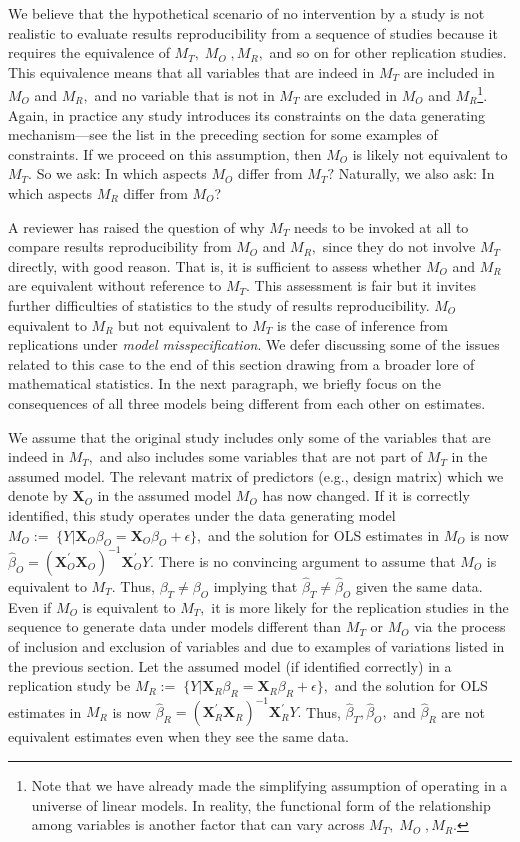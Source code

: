 \documentclass[meta,authordate]{jote-new-article}
\newcommand{\X}{\mathbf{X}}
\newcounter{result}
\begin{document}
We believe that the hypothetical scenario of no intervention by a study is not realistic to evaluate results reproducibility from a sequence of studies because it requires the equivalence of $M_T,\;M_O\;,M_R,$ and so on for other replication studies. This equivalence means that all variables that are indeed in $M_T$ are included in $M_O$ and $M_R,$ and no variable that is not in $M_T$ are excluded in $M_O$ and $M_R$\footnote{Note that we have already made the simplifying assumption of operating in a universe of linear models. In reality, the functional form of the relationship among variables is another factor that can vary across $M_T,\;M_O\;,M_R$.}. Again, in practice any study introduces its constraints on the data generating mechanism---see the list in the preceding section for some examples of constraints. If we proceed on this assumption, then $M_O$ is likely not equivalent to $M_T.$ So we ask: In which aspects $M_O$ differ from $M_T?$ Naturally, we also ask: In which aspects $M_R$ differ from $M_O$?

A reviewer has raised the question of why $M_T$ needs to be invoked at all to compare results reproducibility from $M_O$ and $M_R,$ since they do not involve $M_T$ directly, with good reason. That is, it is sufficient to assess whether $M_O$ and $M_R$ are equivalent without reference to $M_T$. This assessment is fair but it invites further difficulties of statistics to the study of results reproducibility. $M_O$ equivalent to $M_R$ but not equivalent to $M_T$ is the case of inference from replications under {\em model misspecification}. We defer discussing some of the issues related to this case to the end of this section drawing from a broader lore of mathematical statistics. In the next paragraph, we briefly focus on the consequences of all three models being different from each other on estimates.

We assume that the original study includes only some of the variables that are indeed in $M_T,$ and also includes some variables that are not part of $M_T$ in the assumed model. The relevant matrix of predictors (e.g., design matrix) which we denote by $\X_{O}$ in the assumed model $M_O$ has now changed. If it is correctly identified, this study operates under the data generating model
%
$M_O:=\; \{Y|\X_{O}\beta_{O} = \X_{O}\beta_{O}+\epsilon\},$
%
and the solution for OLS estimates in $M_O$ is now
$\hat{\beta}_{O}= (\X_{O}^{'}\X_{O})^{-1}\X_{O}^{'} Y.$
%
There is no convincing argument to assume that $M_O$ is equivalent to $M_T.$ Thus, $\beta_{T} \neq \beta_{O}$ implying that $\hat{\beta}_{T} \neq \hat{\beta}_{O}$ given the same data. Even if $M_O$ is equivalent to $M_T,$ it is more likely for the replication studies in the sequence to generate data under models different than $M_T$ or $M_O$ via the process of inclusion and exclusion of variables and due to examples of variations listed in the previous section. Let the assumed model (if identified correctly) in a replication study be
%
$M_R:=\; \{Y|\X_{R}\beta_{R} =\X_{R}\beta_{R}+\epsilon\},
$
%
and the solution for OLS estimates in $M_R$ is now
$\hat{\beta}_{R}= (\X_{R}^{'}\X_{R})^{-1}\X_{R}^{'} Y.$
%
%
Thus, $\hat{\beta}_{T}, \hat{\beta}_{O},$ and $\hat{\beta}_{R}$ are not equivalent estimates even when they see the same data.
\end{document}

